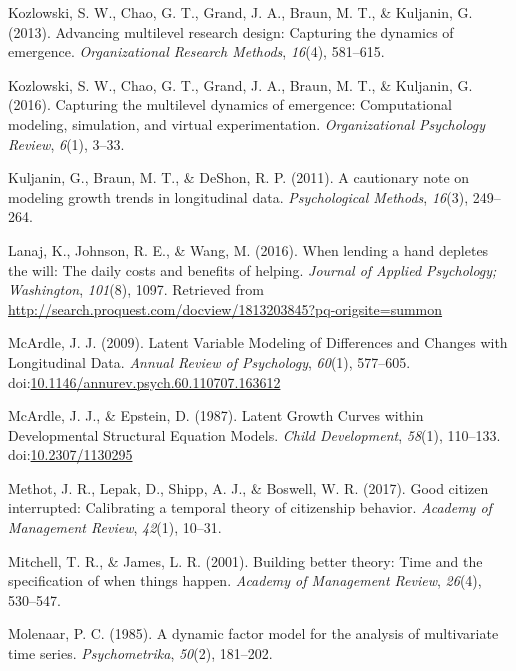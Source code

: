 \documentclass[english,,man]{apa6}
\theoremstyle{definition}
\theoremstyle{definition}
\theoremstyle{definition}
\theoremstyle{remark}
\begin{document}
\leavevmode\hypertarget{ref-kozlowski_advancing_2013}{}%
Kozlowski, S. W., Chao, G. T., Grand, J. A., Braun, M. T., \& Kuljanin,
G. (2013). Advancing multilevel research design: Capturing the dynamics
of emergence. \emph{Organizational Research Methods}, \emph{16}(4),
581--615.

\leavevmode\hypertarget{ref-kozlowski_capturing_2016}{}%
Kozlowski, S. W., Chao, G. T., Grand, J. A., Braun, M. T., \& Kuljanin,
G. (2016). Capturing the multilevel dynamics of emergence: Computational
modeling, simulation, and virtual experimentation. \emph{Organizational
Psychology Review}, \emph{6}(1), 3--33.

\leavevmode\hypertarget{ref-kuljanin2011cautionary}{}%
Kuljanin, G., Braun, M. T., \& DeShon, R. P. (2011). A cautionary note
on modeling growth trends in longitudinal data. \emph{Psychological
Methods}, \emph{16}(3), 249--264.

\leavevmode\hypertarget{ref-lanaj_when_2016}{}%
Lanaj, K., Johnson, R. E., \& Wang, M. (2016). When lending a hand
depletes the will: The daily costs and benefits of helping.
\emph{Journal of Applied Psychology; Washington}, \emph{101}(8), 1097.
Retrieved from
\url{http://search.proquest.com/docview/1813203845?pq-origsite=summon}

\leavevmode\hypertarget{ref-mcardle_latent_2009}{}%
McArdle, J. J. (2009). Latent Variable Modeling of Differences and
Changes with Longitudinal Data. \emph{Annual Review of Psychology},
\emph{60}(1), 577--605.
doi:\href{https://doi.org/10.1146/annurev.psych.60.110707.163612}{10.1146/annurev.psych.60.110707.163612}

\leavevmode\hypertarget{ref-mcardle_latent_1987}{}%
McArdle, J. J., \& Epstein, D. (1987). Latent Growth Curves within
Developmental Structural Equation Models. \emph{Child Development},
\emph{58}(1), 110--133.
doi:\href{https://doi.org/10.2307/1130295}{10.2307/1130295}

\leavevmode\hypertarget{ref-methot2017good}{}%
Methot, J. R., Lepak, D., Shipp, A. J., \& Boswell, W. R. (2017). Good
citizen interrupted: Calibrating a temporal theory of citizenship
behavior. \emph{Academy of Management Review}, \emph{42}(1), 10--31.

\leavevmode\hypertarget{ref-mitchell_building_2001}{}%
Mitchell, T. R., \& James, L. R. (2001). Building better theory: Time
and the specification of when things happen. \emph{Academy of Management
Review}, \emph{26}(4), 530--547.

\leavevmode\hypertarget{ref-molenaar_dynamic_1985}{}%
Molenaar, P. C. (1985). A dynamic factor model for the analysis of
multivariate time series. \emph{Psychometrika}, \emph{50}(2), 181--202.
\end{document}
